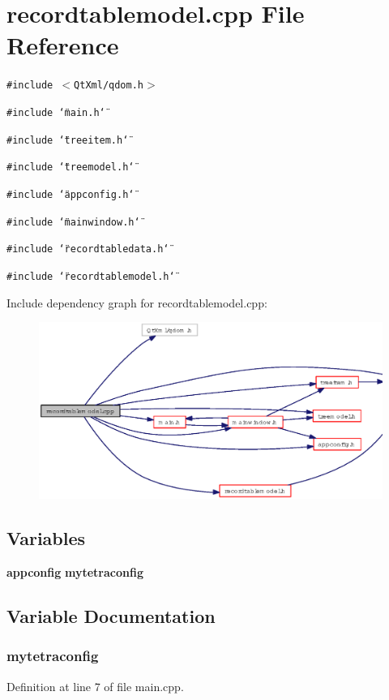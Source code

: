 \section{recordtablemodel.cpp File Reference}
\label{recordtablemodel_8cpp}
{\tt \#include $<$Qt\-Xml/qdom.h$>$}\par
{\tt \#include \char`\"{}main.h\char`\"{}}\par
{\tt \#include \char`\"{}treeitem.h\char`\"{}}\par
{\tt \#include \char`\"{}treemodel.h\char`\"{}}\par
{\tt \#include \char`\"{}appconfig.h\char`\"{}}\par
{\tt \#include \char`\"{}mainwindow.h\char`\"{}}\par
{\tt \#include \char`\"{}recordtabledata.h\char`\"{}}\par
{\tt \#include \char`\"{}recordtablemodel.h\char`\"{}}\par


Include dependency graph for recordtablemodel.cpp:\begin{figure}[H]
\begin{center}
\leavevmode
\includegraphics[width=354pt]{recordtablemodel_8cpp__incl}
\end{center}
\end{figure}
\subsection*{Variables}
\begin{CompactItemize}
\item 
{\bf appconfig} {\bf mytetraconfig}
\end{CompactItemize}


\subsection{Variable Documentation}
\subsubsection{ {\bf mytetraconfig}}\label{recordtablemodel_8cpp_69bd0a7d678d494effdef51808501712}




Definition at line 7 of file main.cpp.